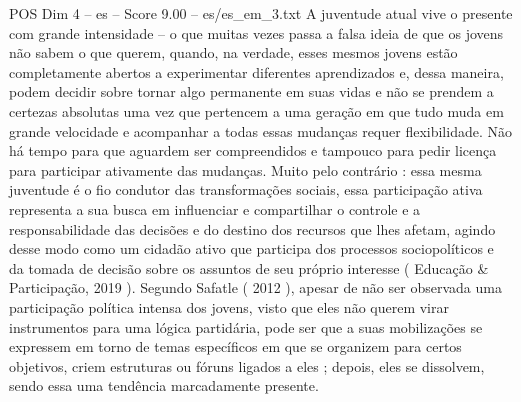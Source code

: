\begin{textsample}{POS Dim 4 – es – Score 9.00 – es/es\_em\_3.txt}
A juventude atual vive o presente com grande intensidade – o que muitas vezes passa a falsa ideia de que os jovens não sabem o que querem, quando, na verdade, esses mesmos jovens estão completamente abertos a experimentar diferentes aprendizados e, dessa maneira, podem decidir sobre tornar algo permanente em suas vidas e não se prendem a certezas absolutas uma vez que pertencem a uma geração em que tudo muda em grande velocidade e acompanhar a todas essas mudanças requer flexibilidade.
Não há tempo para que aguardem ser compreendidos e tampouco para pedir licença para participar ativamente das mudanças.
Muito pelo contrário : essa mesma juventude é o fio condutor das transformações sociais, essa participação ativa representa a sua busca em influenciar e compartilhar o controle e a responsabilidade das decisões e do destino dos recursos que lhes afetam, agindo desse modo como um cidadão ativo que participa dos processos sociopolíticos e da tomada de decisão sobre os assuntos de seu próprio interesse ( Educação \& Participação, 2019 ).
Segundo Safatle ( 2012 ), apesar de não ser observada uma participação política intensa dos jovens, visto que eles não querem virar instrumentos para uma lógica partidária, pode ser que a suas mobilizações se expressem em torno de temas específicos em que se organizem para certos objetivos, criem estruturas ou fóruns ligados a eles ; depois, eles se dissolvem, sendo essa uma tendência marcadamente presente.

\end{textsample}
